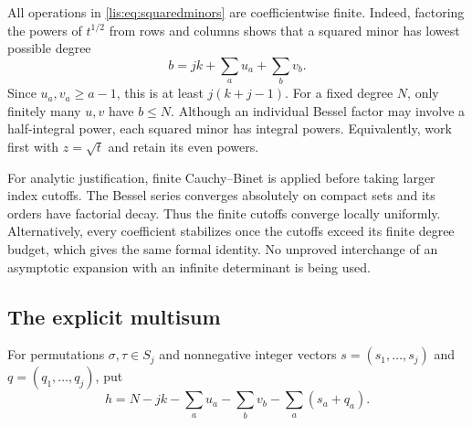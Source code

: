 \documentclass[11pt,letterpaper]{article}
\numberwithin{equation}{section}
\theoremstyle{definition}
\begin{document}
All operations in \eqref{lis:eq:squaredminors} are coefficientwise finite.
Indeed, factoring the powers of $t^{1/2}$ from rows and columns shows
that a squared minor has lowest possible degree
\begin{equation}
 b=jk+\sum_a u_a+\sum_b v_b.
 \label{lis:eq:basedegree}
\end{equation}
Since $u_a,v_a\ge a-1$, this is at least $j(k+j-1)$.
For a fixed degree $N$, only finitely many $u,v$ have $b\le N$.
Although an individual Bessel factor may involve a half-integral power,
each squared minor has integral powers. Equivalently, work first with
$z=\sqrt t$ and retain its even powers.

For analytic justification, finite Cauchy--Binet is applied before taking
larger index cutoffs. The Bessel series converges absolutely on compact
sets and its orders have factorial decay. Thus the finite cutoffs converge
locally uniformly. Alternatively, every coefficient stabilizes once the
cutoffs exceed its finite degree budget, which gives the same formal
identity. No unproved interchange of an asymptotic expansion with an
infinite determinant is being used.

\subsection{The explicit multisum}
For permutations $\sigma,\tau\in S_j$ and nonnegative integer vectors
$s=(s_1,\ldots,s_j)$ and $q=(q_1,\ldots,q_j)$, put
\begin{equation}
 h=N-jk-\sum_a u_a-\sum_b v_b-\sum_a(s_a+q_a).
 \label{lis:eq:h}
\end{equation}
\end{document}
